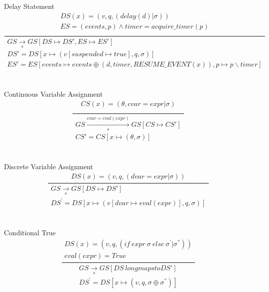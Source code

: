 \documentclass[]{article}
\begin{document}
\\\\
Delay Statement
\begin{equation}\label{DelayStatement}
\frac
{
	\begin{gathered}
	DS(x)=(v,q,(delay(d)|\sigma))  \\ 
	ES= (events,p) \wedge timer = acquire\_timer(p) \\
	\end{gathered}
}
{
	\begin{gathered}
	GS\xrightarrow[s]{}GS[DS\longmapsto DS', ES\longmapsto ES']  \\
	DS'=DS[x\longmapsto(v[suspended\longmapsto true],q,\sigma)]  \\ 
	ES'=ES[events \longmapsto events \oplus (d,timer,RESUME\_EVENT(x)) , p\longmapsto p\backslash timer]
	\end{gathered}
}
\end{equation}
\\\\
Continuous Variable Assignment 
\begin{equation}\label{ContinuousVariableAssignment}
\frac
{
	\begin{gathered}
	CS(x) = (\theta, cvar=expr|\sigma)  \\
	\end{gathered}
}
{
	\begin{gathered}
	GS\xrightarrow[s]{cvar=eval(expr)}GS[CS \longmapsto CS'] \\
	CS' = CS[x \longmapsto (\theta,\sigma)]
	\end{gathered}
}
\end{equation}
\\\\
Discrete Variable Assignment
\begin{equation}\label{DiscreteVariableAssignment}
\frac
{
	\begin{gathered}
	DS(x)=(v,q,(dvar=expr|\sigma))
	\end{gathered}
}
{
	\begin{gathered}
	GS\xrightarrow[s]{}GS[DS\longmapsto DS']  \\
	 DS^{'}=DS[x \longmapsto(v[dvar\longmapsto eval(expr)],q,\sigma)]
	\end{gathered}
}
\end{equation}
\\\\
Conditional True
\begin{equation}
\frac
{
	\begin{gathered}
	DS(x)=(v,q,(if \ expr \ \sigma \ else \ \sigma ^{'} |\sigma ^{''})) \\
	eval(expr) = True
	\end{gathered}
}
{
	\begin{gathered}
	GS\xrightarrow[s]{}GS[DS\ longmapsto DS'] \\
	 DS^{'}=DS[x \longmapsto(v,q,\sigma \oplus \sigma ^{''})]
	\end{gathered}
}
\end{equation}
\end{document}
